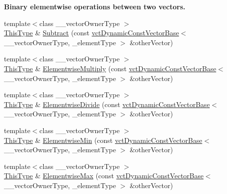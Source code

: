 \begin{Indent}{\bf Binary elementwise operations between two vectors.}
\begin{DoxyCompactItemize}
\item 
{\footnotesize template$<$class \+\_\+\+\_\+vector\+Owner\+Type $>$ }\\\hyperlink{classvct_dynamic_const_vector_base_a39da273523717f678f54d3321ebca3dd}{This\+Type} \& \hyperlink{classvct_dynamic_vector_base_a824ce9d2c9706552ca6116750eeec386}{Subtract} (const \hyperlink{classvct_dynamic_const_vector_base}{vct\+Dynamic\+Const\+Vector\+Base}$<$ \+\_\+\+\_\+vector\+Owner\+Type, \+\_\+element\+Type $>$ \&other\+Vector)
\item 
{\footnotesize template$<$class \+\_\+\+\_\+vector\+Owner\+Type $>$ }\\\hyperlink{classvct_dynamic_const_vector_base_a39da273523717f678f54d3321ebca3dd}{This\+Type} \& \hyperlink{classvct_dynamic_vector_base_aa1dd17f2ca5aa677ae54f469de2e3c5c}{Elementwise\+Multiply} (const \hyperlink{classvct_dynamic_const_vector_base}{vct\+Dynamic\+Const\+Vector\+Base}$<$ \+\_\+\+\_\+vector\+Owner\+Type, \+\_\+element\+Type $>$ \&other\+Vector)
\item 
{\footnotesize template$<$class \+\_\+\+\_\+vector\+Owner\+Type $>$ }\\\hyperlink{classvct_dynamic_const_vector_base_a39da273523717f678f54d3321ebca3dd}{This\+Type} \& \hyperlink{classvct_dynamic_vector_base_a20bfdee5188de2db037dd17a006c5db8}{Elementwise\+Divide} (const \hyperlink{classvct_dynamic_const_vector_base}{vct\+Dynamic\+Const\+Vector\+Base}$<$ \+\_\+\+\_\+vector\+Owner\+Type, \+\_\+element\+Type $>$ \&other\+Vector)
\item 
{\footnotesize template$<$class \+\_\+\+\_\+vector\+Owner\+Type $>$ }\\\hyperlink{classvct_dynamic_const_vector_base_a39da273523717f678f54d3321ebca3dd}{This\+Type} \& \hyperlink{classvct_dynamic_vector_base_afa0399fb7fb0ac76bef4c6550696cbdd}{Elementwise\+Min} (const \hyperlink{classvct_dynamic_const_vector_base}{vct\+Dynamic\+Const\+Vector\+Base}$<$ \+\_\+\+\_\+vector\+Owner\+Type, \+\_\+element\+Type $>$ \&other\+Vector)
\item 
{\footnotesize template$<$class \+\_\+\+\_\+vector\+Owner\+Type $>$ }\\\hyperlink{classvct_dynamic_const_vector_base_a39da273523717f678f54d3321ebca3dd}{This\+Type} \& \hyperlink{classvct_dynamic_vector_base_a9d782455c955138903ef49a02b173aad}{Elementwise\+Max} (const \hyperlink{classvct_dynamic_const_vector_base}{vct\+Dynamic\+Const\+Vector\+Base}$<$ \+\_\+\+\_\+vector\+Owner\+Type, \+\_\+element\+Type $>$ \&other\+Vector)
\item 

\end{DoxyCompactItemize}
\end{Indent}

